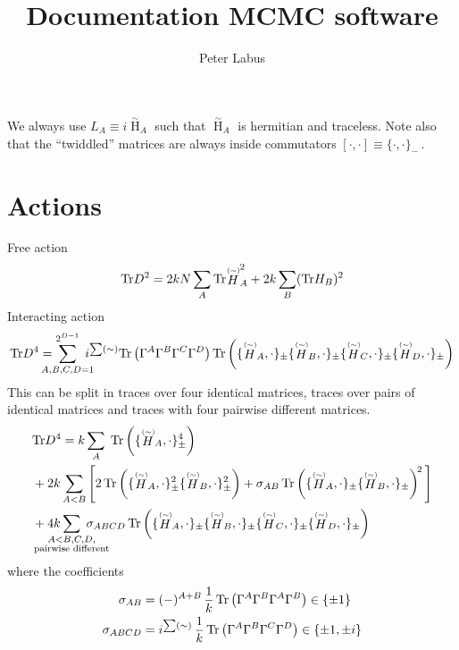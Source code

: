 \documentclass[10pt,a4paper]{article}
\author{Peter Labus}
\title{Documentation MCMC software}
\newcommand\ptwid[1]{\mathord{\mathop{#1}\limits^{\scriptscriptstyle(\sim)}}}
\newcommand\twid[1]{\mathord{\mathop{#1}\limits^{\scriptscriptstyle\sim}}}
\newcommand{\Tr}{\mathrm{Tr}\vspace{-2pt}}
\begin{document}
\maketitle

We always use $L_A \equiv i \twid H_A$ such that $\twid H_A$
is hermitian and traceless.
Note also that the ``twiddled'' matrices are always inside
commutators $[\cdot,\cdot] \equiv \{\cdot,\cdot\}_{-}\,$.

\section{Actions}

Free action
\begin{equation}
  \Tr D^2 = 2kN \sum_{A}  \Tr \ptwid H_A^2
  + 2k \sum_{B}  ( \Tr H_B )^2
\end{equation}
Interacting action
\begin{equation}
  \Tr D^4 = \sum_{\mathclap{A,B,C,D=1}}^{2^{D-1}} \; i^{\sum (\sim)}  \Tr \left(\Gamma^A \Gamma^B \Gamma^C \Gamma^D \right)
 \Tr \left( \{ \ptwid H_A, \cdot \}_{\pm}
 \{ \ptwid H_B, \cdot \}_{\pm}
 \{ \ptwid H_C, \cdot \}_{\pm}
 \{ \ptwid H_D, \cdot \}_{\pm} \right)
\end{equation}
This can be split in traces over four identical matrices, traces over
pairs of identical matrices and traces with
four pairwise different matrices.
\begin{align}
  &\Tr D^4 =
  k \sum_{A} \; \Tr \left( \{ \ptwid H_A, \cdot \}_{\pm}^4 \right)
  \nonumber \\
  &+ 2k \sum_{A<B}
  \Bigg[
    2 \, \Tr \left( \{ \ptwid H_A, \cdot \}_{\pm}^2   \{ \ptwid H_B, \cdot \}_{\pm}^2 \right)
    + \sigma_{AB} \, \Tr \left( \{ \ptwid H_A, \cdot \}_{\pm}   \{ \ptwid H_B, \cdot \}_{\pm} \right)^{\! 2}
  \Bigg]
  \nonumber \\
  &+ 4k
  \sum_{\mathclap{\substack{A<B,C,D,\\ \text{pairwise different}  }}} \;
  \sigma_{ABCD} \, \Tr \left( \{ \ptwid H_A, \cdot \}_{\pm}   \{ \ptwid H_B, \cdot \}_{\pm}
  \{ \ptwid H_C, \cdot \}_{\pm}   \{ \ptwid H_D, \cdot \}_{\pm} \right)
\end{align}
where the coefficients
\begin{align}
\sigma_{AB} &=  (-)^{A+B} \, \frac{1}{k} \, \Tr \left(\Gamma^A \Gamma^B \Gamma^A \Gamma^B \right) \in \{\pm 1\}\\
  \sigma_{ABCD} &=  i^{\sum (\sim)} \, \frac{1}{k} \, \Tr \left(\Gamma^A \Gamma^B \Gamma^C \Gamma^D \right) \in \{\pm 1, \pm i\}
\end{align}
\end{document}
